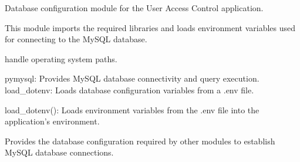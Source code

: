 \documentclass[letterpaper,10pt,english]{sphinxmanual}
\begin{document}
\sphinxAtStartPar
{}
\label{\detokenize{modules:module-app.db}}
\sphinxAtStartPar
Database configuration module for the User Access Control application.

\sphinxAtStartPar
This module imports the required libraries and loads environment
variables used for connecting to the MySQL database.
\begin{description}
\begin{description}
\sphinxAtStartPar
handle operating system paths.

\end{description}

\sphinxAtStartPar
pymysql: Provides MySQL database connectivity and query execution.
load\_dotenv: Loads database configuration variables from a .env file.

\sphinxAtStartPar
load\_dotenv(): Loads environment variables from the .env file
into the application’s environment.

\sphinxAtStartPar
Provides the database configuration required by other modules
to establish MySQL database connections.

\end{description}
\end{document}
